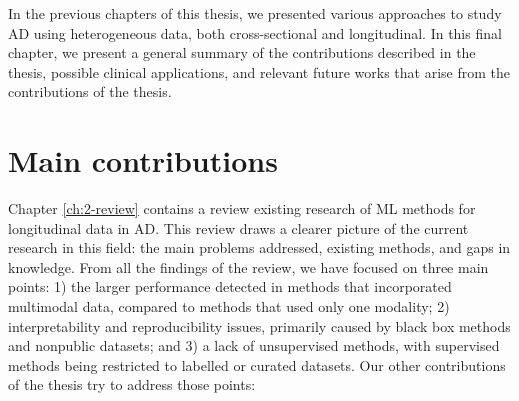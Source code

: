 In the previous chapters of this thesis, we presented various approaches to study AD using heterogeneous data, both cross-sectional and longitudinal. In this final chapter, we present a general summary of the contributions described in the thesis, possible clinical applications, and relevant future works that arise from the contributions of the thesis.

\section{Main contributions}
Chapter \ref{ch:2-review} contains a review existing research of ML methods for longitudinal data in AD. This review draws a clearer picture of the current research in this field: the main problems addressed, existing methods, and gaps in knowledge. From all the findings of the review, we have focused on three main points: 1) the larger performance detected in methods that incorporated multimodal data, compared to methods that used only one modality; 2) interpretability and reproducibility issues, primarily caused by black box methods and nonpublic datasets; and 3) a lack of unsupervised methods, with supervised methods being restricted to labelled or curated datasets. Our other contributions of the thesis try to address those points: 


